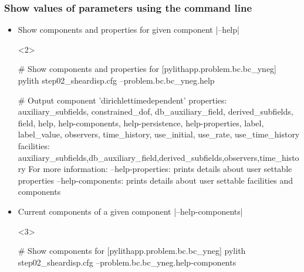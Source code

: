 \documentclass[aspectratio=169]{beamer}
\begin{document}
\begin{frame}[t,fragile]
  \frametitle{Show values of parameters using the command line}

  \begin{itemize}
  \item Show components and properties for given component \bashinline|--help|
    \begin{onlyenv}<2>
      \begin{pyrejournal}
        # Show components and properties for [pylithapp.problem.bc.bc_yneg]
        pylith step02_sheardisp.cfg --problem.bc.bc_yneg.help

        # Output
        component 'dirichlettimedependent'
            properties: auxiliary_subfields, constrained_dof, db_auxiliary_field, derived_subfields, field, help, help-components, help-persistence, help-properties, label, label_value, observers, time_history, use_initial, use_rate, use_time_history
            facilities: auxiliary_subfields,db_auxiliary_field,derived_subfields,observers,time_history
        For more information:
            --help-properties: prints details about user settable properties
            --help-components: prints details about user settable facilities and components
      \end{pyrejournal}
    \end{onlyenv}    
  \item Current components of a given component \bashinline|--help-components|
    \begin{onlyenv}<3>
      \begin{pyrejournal}
        # Show components for [pylithapp.problem.bc.bc_yneg]
        pylith step02_sheardisp.cfg --problem.bc.bc_yneg.help-components


\end{pyrejournal}
\end{onlyenv}
\end{itemize}
\end{frame}
\end{document}
